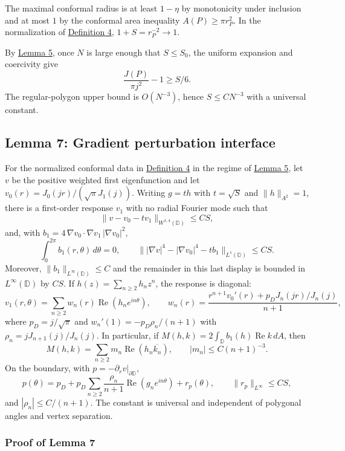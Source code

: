 \documentclass[11pt]{article}
\begin{document}
The maximal conformal radius is at least \(1-\eta\) by monotonicity
under inclusion and at most \(1\) by the conformal area inequality
\(A(P)\ge\pi r_P^2\). In the normalization of
\hyperref[def-conformal-data]{Definition 4}, \(1+S=r_P^{-2}\to1\).

By \hyperref[lem-disk-perturbation]{Lemma 5}, once \(N\) is large enough
that \(S\le S_0\), the uniform expansion and coercivity give \[
\frac{J(P)}{\pi j^2}-1\ge S/6.
\] The regular-polygon upper bound is \(O(N^{-3})\), hence
\(S\le CN^{-3}\) with a universal constant.

\subsection{Lemma 7: Gradient perturbation
interface}\label{lem-gradient-perturbation}

For the normalized conformal data in
\hyperref[def-conformal-data]{Definition 4} in the regime of
\hyperref[lem-disk-perturbation]{Lemma 5}, let \(v\) be the positive
weighted first eigenfunction and let
\(v_0(r)=J_0(jr)/(\sqrt\pi J_1(j))\). Writing \(g=t h\) with
\(t=\sqrt S\) and \(\|h\|_{A^2}=1\), there is a first-order response
\(v_1\) with no radial Fourier mode such that \[
\|v-v_0-t v_1\|_{W^{1,4}(\mathbb D)}\le CS,
\] and, with \(b_1=4\,\nabla v_0\cdot\nabla v_1\,|\nabla v_0|^2\), \[
\int_0^{2\pi}b_1(r,\theta)\,d\theta=0,
\qquad
\bigl\||\nabla v|^4-|\nabla v_0|^4-tb_1\bigr\|_{L^1(\mathbb D)}\le CS.
\] Moreover, \(\|b_1\|_{L^\infty(\mathbb D)}\le C\) and the remainder in
this last display is bounded in \(L^\infty(\mathbb D)\) by \(CS\). If
\(h(z)=\sum_{n\ge2}h_nz^n\), the response is diagonal: \[
v_1(r,\theta)=\sum_{n\ge2}w_n(r)\operatorname{Re}(h_ne^{in\theta}),
\qquad
w_n(r)=\frac{r^{n+1}v_0'(r)+p_DJ_n(jr)/J_n(j)}{n+1},
\] where \(p_D=j/\sqrt\pi\) and \(w_n'(1)=-p_D\rho_n/(n+1)\) with
\(\rho_n=jJ_{n+1}(j)/J_n(j)\). In particular, if
\(M(h,k)=2\int_{\mathbb D}b_1(h)\operatorname{Re}k\,dA\), then \[
M(h,k)=\sum_{n\ge2}m_n\operatorname{Re}(h_n\overline{k_n}),
\qquad |m_n|\le C(n+1)^{-3}.
\] On the boundary, with \(p=-\partial_rv|_{\partial\mathbb D}\), \[
p(\theta)=p_D+p_D\sum_{n\ge2}\frac{\rho_n}{n+1}\operatorname{Re}(g_ne^{in\theta})+r_p(\theta),
\qquad \|r_p\|_{L^\infty}\le CS,
\] and \(|\rho_n|\le C/(n+1)\). The constant is universal and
independent of polygonal angles and vertex separation.

\subsubsection{Proof of Lemma 7}\label{proof-lem-gradient-perturbation}
\end{document}

